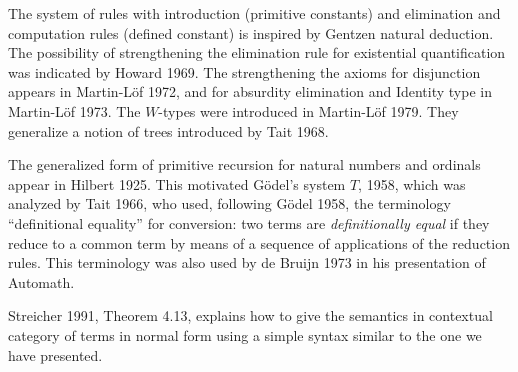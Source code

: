 
 The system of rules with introduction (primitive constants) and elimination and computation rules
(defined constant) is inspired by Gentzen natural deduction. The possibility of strengthening
the elimination rule for existential quantification was indicated by Howard 1969. The strengthening
the axioms for disjunction appears in Martin-L\"of 1972, and for absurdity elimination and Identity type
in Martin-L\"of 1973. The $W$-types were introduced in Martin-L\"of 1979. They generalize a notion
of trees introduced by Tait 1968.%

 The generalized form of primitive recursion for natural numbers and ordinals appear in Hilbert 1925.
This motivated G\"odel's system $T$, 1958, which was analyzed by Tait 1966, who used, following
G\"odel 1958, the terminology
``definitional equality'' for conversion: two terms are {\em definitionally equal} if they reduce
to a common term by means of a sequence of applications of the reduction rules. This terminology was
also used by de Bruijn 1973 in his presentation of Automath.

 Streicher 1991, Theorem 4.13, explains how to give the semantics in contextual category of terms in normal
form using a simple syntax similar to the one we have presented.

%  


